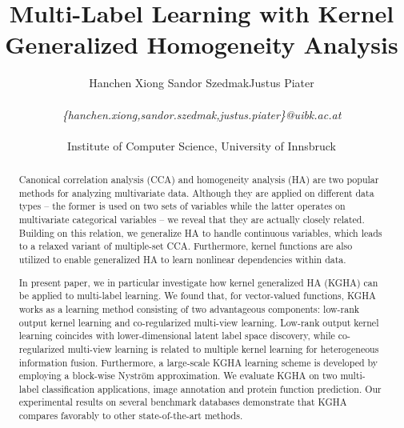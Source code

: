 \documentclass[a4paper]{article}
\title{Multi-Label Learning with Kernel Generalized Homogeneity Analysis}
\date{}
\author{Hanchen Xiong \quad Sandor Szedmak\quad Justus Piater\\ \\
	\textit{\{hanchen.xiong,sandor.szedmak,justus.piater\}@uibk.ac.at} \\ \\
Institute of Computer Science, University of Innsbruck}
\begin{document}
 
\maketitle



\begin{abstract} 
Canonical correlation analysis (CCA) and homogeneity analysis (HA) are two popular methods for analyzing multivariate data. Although they are applied on
different data types -- the former is used on two sets of variables while the latter operates on multivariate categorical variables -- we reveal that 
they are actually closely related. Building on this relation, we generalize HA to handle continuous variables, which leads to a 
relaxed variant of multiple-set CCA. Furthermore, kernel functions are also utilized to enable generalized HA to learn nonlinear dependencies within data.

In present paper, we in particular investigate how kernel generalized HA (KGHA) can be applied to multi-label learning. We found that, for vector-valued functions, KGHA works as a       
learning method consisting of two advantageous components: low-rank output kernel learning and co-regularized multi-view learning. 
Low-rank output kernel learning coincides with lower-dimensional 
latent label space discovery, while co-regularized multi-view learning is related to multiple kernel learning for heterogeneous information fusion. 
Furthermore, a large-scale KGHA learning scheme is developed by employing a block-wise Nystr{\"o}m approximation.      
We evaluate KGHA on two multi-label classification applications, image annotation and protein function prediction.
Our experimental results on several benchmark databases demonstrate that KGHA compares favorably to other state-of-the-art methods.\end{abstract} 
\end{document}
